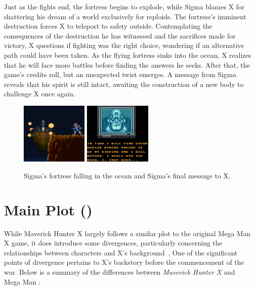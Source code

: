 Just as the fights end, the fortress begins to explode, while Sigma blames X for shattering his dream of a world exclusively for reploids. The fortress's imminent destruction forces X to teleport to safety outside. Contemplating the consequences of the destruction he has witnessed and the sacrifices made for victory, X questions if fighting was the right choice, wondering if an alternative path could have been taken. As the flying fortress sinks into the ocean, X realizes that he will face more battles before finding the answers he seeks. After that, the game's credits roll, but an unexpected twist emerges. A message from Sigma reveals that his spirit is still intact, awaiting the construction of a new body to challenge X once again. 
\begin{figure}[htp]
	\centering
	\includegraphics[height=3cm]{figures/X1/Ending.jpg}
	\includegraphics[height=3cm]{figures/X1/sigma_message.jpg}
	\caption{Sigma's fortress falling in the ocean and Sigma's final message to X.}
\end{figure}

\section{Main Plot (\mhx)}
While Maverick Hunter X largely follows a similar plot to the original Mega Man X game, it does introduce some divergences, particularly concerning the relationships between characters and X's background~\cite{wiki:MM_MHX}. One of the significant points of divergence pertains to X's backstory before the commencement of the war. Below is a summary of the differences between \textit{Maverick Hunter X} and Mega Man \x:



